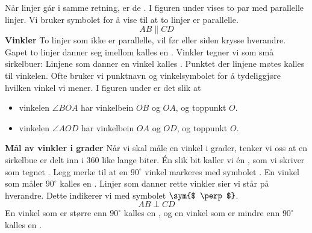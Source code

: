Når linjer går i samme retning, er de . I figuren under vises to par med parallelle linjer.
Vi bruker symbolet \sym{$ \parallel $} for å vise til at to linjer er parallelle.
\[ AB\parallel CD \]
\textbf{Vinkler} \label{vinklar}\os
To linjer som ikke er parallelle, vil før eller siden krysse hverandre. Gapet to linjer danner seg imellom kalles en . Vinkler tegner vi som små sirkelbuer:
Linjene som danner en vinkel kalles . Punktet der linjene møtes kalles  til vinkelen. Ofte bruker vi punktnavn og vinkelsymbolet \sym{$ \angle $} for å tydeliggjøre hvilken vinkel vi mener. I figuren under er det slik at
\begin{itemize}
\item vinkelen $ \angle BOA $  har vinkelbein $ OB $ og $ OA $, og toppunkt $ O $.
\item vinkelen $ \angle AOD $  har vinkelbein $ OA $ og $ OD $, og toppunkt $ O $.	
\end{itemize}
\newpage
\textbf{Mål av vinkler i grader}\os
Når vi skal måle en vinkel i grader, tenker vi oss at en sirkelbue er delt inn i 360 like lange biter. Én slik bit kaller vi én , som vi skriver som tegnet \sym{$ ^\circ $}. 
 \vsk
Legg merke til at en $ 90^\circ $ vinkel markeres med symbolet \sym{$ \square $}. En vinkel som måler $ 90^\circ $ kalles en . Linjer som danner rette vinkler sier vi står  på hverandre. Dette indikerer vi med symbolet $ \sym{$ \perp $} $.
\[ AB\perp CD \]
\newpage
En vinkel som er større enn $ 90^\circ $ kalles en , og en vinkel som er mindre enn $ 90^\circ $ kalles en .
 \vsk

\vsk
\label{vinkelend}
\newpage
{}


